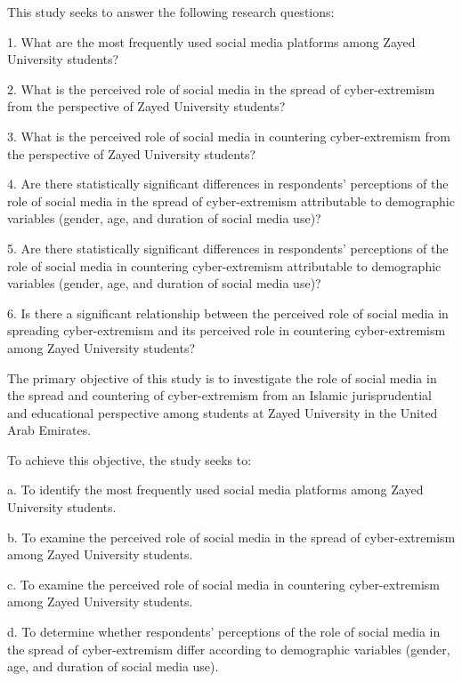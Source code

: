 \documentclass{NSP1}
\begin{document}
\par\medskip{}\smallskip

This study seeks to answer the following research questions:

1. What are the most frequently used social media platforms among Zayed University students?

2. What is the perceived role of social media in the spread of cyber-extremism from the perspective of Zayed University students?

3. What is the perceived role of social media in countering cyber-extremism from the perspective of Zayed University students?

4. Are there statistically significant differences in respondents' perceptions of the role of social media in the spread of cyber-extremism attributable to demographic variables (gender, age, and duration of social media use)?

5. Are there statistically significant differences in respondents' perceptions of the role of social media in countering cyber-extremism attributable to demographic variables (gender, age, and duration of social media use)?

6. Is there a significant relationship between the perceived role of social media in spreading cyber-extremism and its perceived role in countering cyber-extremism among Zayed University students?

\par\medskip{}\smallskip

The primary objective of this study is to investigate the role of social media in the spread and countering of cyber-extremism from an Islamic jurisprudential and educational perspective among students at Zayed University in the United Arab Emirates.

To achieve this objective, the study seeks to:

a. To identify the most frequently used social media platforms among Zayed University students.

b. To examine the perceived role of social media in the spread of cyber-extremism among Zayed University students.

c. To examine the perceived role of social media in countering cyber-extremism among Zayed University students.

d. To determine whether respondents' perceptions of the role of social media in the spread of cyber-extremism differ according to demographic variables (gender, age, and duration of social media use).
\end{document}
